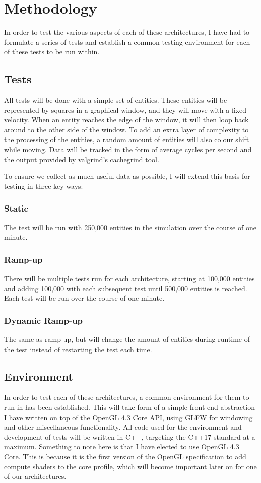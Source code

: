 \documentclass{article}
\begin{document}
\section{Methodology}
In order to test the various aspects of each of these architectures, I have had
to formulate a series of tests and establish a common testing environment for
each of these tests to be run within.

\subsection{Tests}
All tests will be done with a simple set of entities. These entities will be
represented by squares in a graphical window, and they will move with a fixed
velocity. When an entity reaches the edge of the window, it will then loop back
around to the other side of the window. To add an extra layer of complexity to
the processing of the entities, a random amount of entities will also colour
shift while moving. Data will be tracked in the form of average cycles per
second and the output provided by valgrind's cachegrind tool.

To ensure we collect as much useful data as possible, I will extend this basis
for testing in three key ways:

\subsubsection{Static}
The test will be run with 250,000 entities in the simulation over the course of
one minute.

\subsubsection{Ramp-up}
There will be multiple tests run for each architecture, starting at 100,000
entities and adding 100,000 with each subsequent test until 500,000 entities is
reached. Each test will be run over the course of one minute.

\subsubsection{Dynamic Ramp-up}
The same as ramp-up, but will change the amount of entities during runtime of
the test instead of restarting the test each time. 

\subsection{Environment}
In order to test each of these architectures, a common environment for them to
run in has been established. This will take form of a simple front-end
abstraction I have written on top of the OpenGL 4.3 Core API, using GLFW for
windowing and other miscellaneous functionality. All code used for the
environment and development of tests will be written in C++, targeting the C++17
standard at a maximum. Something to note here is that I have elected to use
OpenGL 4.3 Core. This is because it is the first version of the OpenGL
specification to add compute shaders to the core profile, which will become
important later on for one of our architectures.
\end{document}
